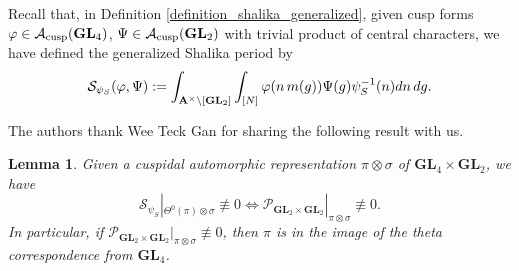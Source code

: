\documentclass[11pt, reqno]{amsart}
\theoremstyle{plain}
\newtheorem{lemma}[theorem]{Lemma}
\theoremstyle{definition}
\theoremstyle{remark}
\theoremstyle{plain}
\def\A{{\bf A}}
\def\GL{\mathbf{GL}}
\begin{document}
Recall that, in Definition \ref{definition_shalika_generalized}, given cusp forms $\varphi \in \mathcal{A}_{{\rm cusp}}(\GL_4)$, $\Psi \in \mathcal{A}_{{\rm cusp}}(\GL_2)$ with trivial product of central characters, we have defined the generalized Shalika period by
   \[\mathcal{S}_{\psi_S}({\varphi,\Psi}):= \int_{\A^\times \backslash[\GL_2]} \int_{[N]}  \varphi(n\, m(g))\Psi(g) \psi_S^{-1}(n) dn\,dg.\]


The authors thank Wee Teck Gan for sharing the following result with us. 

\begin{lemma}\label{Shalika:Equals:Period}
Given a cuspidal automorphic representation $\pi \otimes \sigma$ of $\GL_4 \times \GL_2$, we have 
$$\mathcal{S}_{\psi_S}|_{\Theta^0(\pi) \otimes \sigma}  \not \equiv 0 \Longleftrightarrow {\mathcal{P}_{ \GL_2 \times \GL_2}}|_{\pi \otimes \sigma} \not \equiv 0.$$
In particular, if ${\mathcal{P}_{ \GL_2 \times \GL_2}}|_{\pi \otimes \sigma}  \not \equiv 0$, then $\pi$ is in the image of the theta correspondence from $\GL_4$.
\end{lemma}
\end{document}
